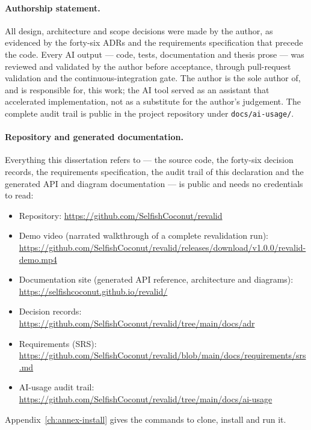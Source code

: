 \paragraph{Authorship statement.} All design, architecture and scope decisions were
made by the author, as evidenced by the forty-six ADRs and the requirements
specification that precede the code. Every AI output --- code, tests, documentation
and thesis prose --- was reviewed and validated by the author before acceptance,
through pull-request validation and the continuous-integration gate. The author is
the sole author of, and is responsible for, this work; the AI tool served as an
assistant that accelerated implementation, not as a substitute for the author's
judgement. The complete audit trail is public in the project repository under
\texttt{docs/ai-usage/}.

\paragraph{Repository and generated documentation.} Everything this dissertation refers
to --- the source code, the forty-six decision records, the requirements specification,
the audit trail of this declaration and the generated API and diagram documentation ---
is public and needs no credentials to read:
\begin{itemize}
\item Repository: \url{https://github.com/SelfishCoconut/revalid}
\item Demo video (narrated walkthrough of a complete revalidation run):
  \url{https://github.com/SelfishCoconut/revalid/releases/download/v1.0.0/revalid-demo.mp4}
\item Documentation site (generated API reference, architecture and diagrams):
  \url{https://selfishcoconut.github.io/revalid/}
\item Decision records: \url{https://github.com/SelfishCoconut/revalid/tree/main/docs/adr}
\item Requirements (SRS):
  \url{https://github.com/SelfishCoconut/revalid/blob/main/docs/requirements/srs.md}
\item AI-usage audit trail:
  \url{https://github.com/SelfishCoconut/revalid/tree/main/docs/ai-usage}
\end{itemize}
Appendix~\ref{ch:annex-install} gives the commands to clone, install and run it.
